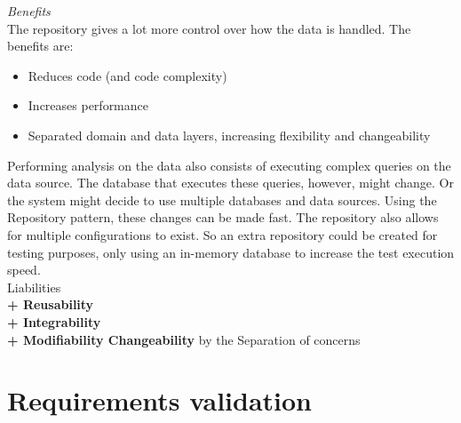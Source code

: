 \textit{Benefits} \\

The repository gives a lot more control over how the data is handled. The benefits are:
\begin{itemize}
\item Reduces code (and code complexity)
\item Increases performance
\item Separated domain and data layers, increasing flexibility and changeability
\end{itemize}

Performing analysis on the data also consists of executing complex queries on the data source. The database that executes these queries, however, might change. Or the system might decide to use multiple databases and data sources.
Using the Repository pattern, these changes can be made fast. The repository also allows for multiple configurations to exist. So an extra repository could be created for testing purposes, only using an in-memory database to increase the test execution speed. \\

\textit{} Liabilities \\
\textbf{+ Reusability} \\
\textbf{+ Integrability} \\
\textbf{+ Modifiability Changeability} by the Separation of concerns\\

\section{Requirements validation}
\label{sec:req-validation}



